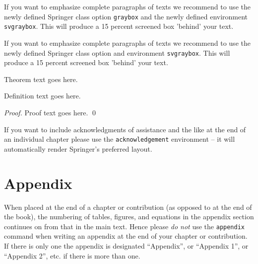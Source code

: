 \documentclass[graybox, envcountchap]{svmult}
\begin{document}
\begin{svgraybox}
If you want to emphasize complete paragraphs of texts we recommend to use the newly defined Springer class option \verb|graybox| and the newly defined environment \verb|svgraybox|. This will produce a 15 percent screened box 'behind' your text.

If you want to emphasize complete paragraphs of texts we recommend to use the newly defined Springer class option and environment \verb|svgraybox|. This will produce a 15 percent screened box 'behind' your text.
\end{svgraybox}



\begin{theorem}
Theorem text goes here.
\end{theorem}
%
%
\begin{definition}
Definition text goes here.
\end{definition}



\begin{proof}
Proof text goes here.
\qed
\end{proof}










\begin{acknowledgement}
If you want to include acknowledgments of assistance and the like at the end of an individual chapter please use the \verb|acknowledgement| environment -- it will automatically render Springer's preferred layout.
\end{acknowledgement}










\section*{Appendix}

When placed at the end of a chapter or contribution (as opposed to at the end of the book), the numbering of tables, figures, and equations in the appendix section continues on from that in the main text. Hence please \textit{do not} use the \verb|appendix| command when writing an appendix at the end of your chapter or contribution. If there is only one the appendix is designated ``Appendix'', or ``Appendix 1'', or ``Appendix 2'', etc. if there is more than one.
\end{document}
